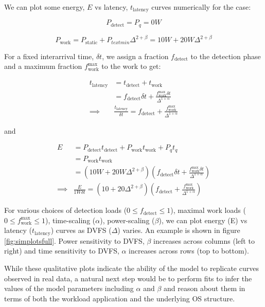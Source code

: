We can plot some energy, $E$ vs latency, $t_{\text{latency}}$ curves numerically for the case:

$$P_{\text{detect}} = P_q = 0W$$

$$P_{\text{work}} = P_{\text{static}} + P_{text{min}} \Delta^{2+\beta} = 10W + 20W \Delta^{2+\beta}$$

For a fixed interarrival time, $\delta t$, we assign a fraction $f_{\text{detect}}$ to the detection phase and a maximum fraction $f_{\text{work}}^{\text{max}}$ to the work to get:

\begin{equation}
\begin{split}
    t_{\text{latency}} &= t_{\text{detect}} + t_{\text{work}} \\
    &= f_{\text{detect}}\delta t + \frac{f_{\text{work}}^{\text{max}}\delta t}{\Delta^{1+\alpha}}  \\
\implies & \boxed{\frac{t_{\text{latency}}}{\delta t} = f_{\text{detect}} + \frac{f_{\text{work}}^{\text{max}}}{\Delta^{1+\alpha}}}
\end{split}
\end{equation}

and

\begin{equation}
\begin{split}
    E &= P_\text{detect} t_{\text{detect}} + P_{\text{work}}  t_{\text{work}} + P_q t_q \\
    &= P_{\text{work}}  t_{\text{work}} \\
    &= (10W + 20W \Delta^{2+\beta}) (f_{\text{detect}}\delta t + \frac{f_{\text{work}}^{\text{max}}\delta t}{\Delta^{1+\alpha}}) \\
    \implies &\boxed{\frac{E}{1W \delta t} = (10 + 20 \Delta^{2+\beta})(f_{\text{detect}} + \frac{f_{\text{work}}^{\text{max}}}{\Delta^{1+\alpha}})}
\end{split}
\end{equation}

For various choices of detection loads ($0 \leq f_{\text{detect}} \leq 1$), maximal work loads ($0 \leq f_{\text{work}}^{\text{max}} \leq 1$), time-scaling ($\alpha$), power-scaling ($\beta$), we can plot energy (E) vs latency ($t_{\text{latency}}$) curves as DVFS ($\Delta$) varies. An example is shown in figure \ref{fig:simplotsfull}. Power sensitivity to DVFS, $\beta$ increases across columns (left to right) and time sensitivity to DVFS, $\alpha$ increases across rows (top to bottom).

While these qualitative plots indicate the ability of the model to replicate curves observed in real data, a natural next step would be to perform fits to infer the values of the model parameters including $\alpha$ and $\beta$ and reason about them in terms of both the workload application and the underlying OS structure.

